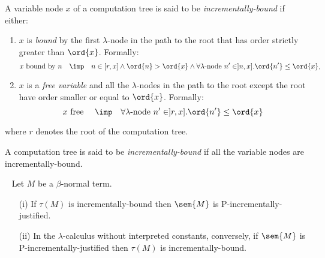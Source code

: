 \begin{definition}
A variable node $x$ of a computation tree is said to be
\emph{incrementally-bound} if either:
\begin{enumerate}
\item $x$ is \emph{bound} by the first $\lambda$-node in the path to the root that has
order strictly greater than $\ord{x}$. Formally:
$$ x \mbox{ bound by } n \quad \imp \quad n \in [r,x] \wedge \ord{n} > \ord{x} \wedge \forall \lambda\mbox{-node } n' \in ]n,x] . \ord{n'} \leq \ord{x},$$

\item $x$ is a \emph{free variable} and all the $\lambda$-nodes in the path to the root except the root have order
smaller or equal to $\ord{x}$. Formally:
$$ x \mbox{ free } \quad \imp \quad  \forall \lambda\mbox{-node } n' \in ]r,x] . \ord{n'} \leq \ord{x}$$
\end{enumerate}
where $r$ denotes the root of the computation tree.

A computation tree is said to be \emph{incrementally-bound} if all
the variable nodes are incrementally-bound.
\end{definition}

\begin{proposition} \
\label{prop:incrbound_imp_incrjustified} Let $M$ be a $\beta$-normal
term.
\begin{enumerate}
\item[(i)] If $\tau(M)$ is incrementally-bound then $\sem{M}$ is P-incrementally-justified.
\item[(ii)] In the $\lambda$-calculus without interpreted constants, conversely, if $\sem{M}$ is P-incrementally-justified then
$\tau(M)$ is incrementally-bound.
\end{enumerate}
\end{proposition}

